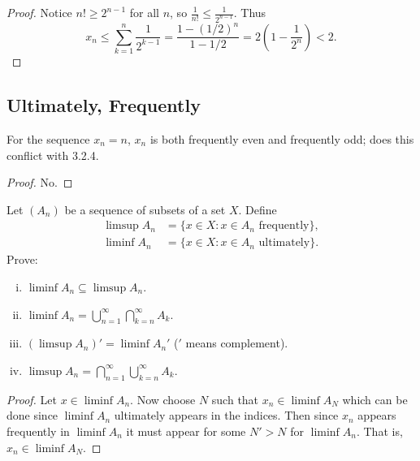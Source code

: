 \begin{proof}
    Notice $n! \ge 2^{n-1}$ for all $n$, so $\frac{1}{n!} \le \frac{1}{2^{n-1}}$. Thus
    \[x_n \le \sum_{k=1}^{n} \frac{1}{2^{k-1}} = \frac{1 - (1/2)^n}{1 - 1/2} 
    = 2\left(1 - \frac{1}{2^n}\right) < 2.\]
\end{proof}

\subsection{Ultimately, Frequently}

\newpage
\begin{tcolorbox}[title=Problem 1, breakable]
    For the sequence $x_n = n$, $x_n$ is both frequently even and frequently odd;  
        does this conflict with 3.2.4.
\end{tcolorbox}

\begin{proof}
    No.
\end{proof}

\begin{tcolorbox}[title=Problem 3, breakable]
    Let $(A_n)$ be a sequence of subsets of a set $X$. Define
    \begin{align*}
        \limsup A_n &= \{x \in X : x \in A_n \text{ frequently}\}, \\
        \liminf A_n &= \{x \in X : x \in A_n \text{ ultimately}\}.
    \end{align*}
    Prove:
    \begin{enumerate}[(i)]
        \item $\liminf A_n \subseteq \limsup A_n$.
        \item $\liminf A_n = \bigcup_{n=1}^{\infty} \bigcap_{k=n}^{\infty} A_k$.
        \item $(\limsup A_n)' = \liminf A_n'$ \quad ($'$ means complement).
        \item $\limsup A_n = \bigcap_{n=1}^{\infty} \bigcup_{k=n}^{\infty} A_k$.
    \end{enumerate}
\end{tcolorbox}

\begin{proof}
     Let $x \in \liminf A_n$.
     Now choose $N$ such that $x_n \in \liminf A_N$ which can be done 
        since $  \liminf A_n$ ultimately appears in the indices.
    Then since $x_n$ appears frequently in $\liminf A_n$ it must appear for some $N' > N$
        for $\liminf A_n$.
    That is, $x_n \in \liminf A_N$.
\end{proof}

